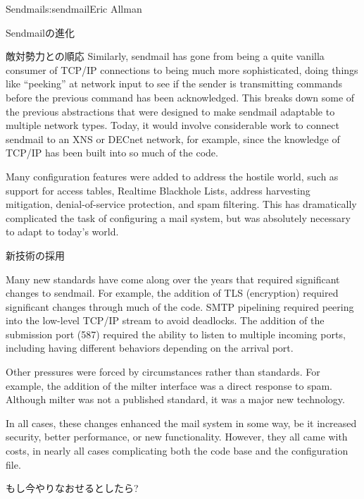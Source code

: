 \begin{aosachapter}{Sendmail}{s:sendmail}{Eric Allman}
\begin{aosasect1}{Sendmailの進化}
\begin{aosasect2}{敵対勢力との順応}
Similarly, sendmail has gone from being a quite vanilla consumer of
TCP/IP connections to being much more sophisticated, doing things like
``peeking'' at network input to see if the sender is transmitting
commands before the previous command has been acknowledged. This
breaks down some of the previous abstractions that were designed to
make sendmail adaptable to multiple network types.  Today, it would
involve considerable work to connect sendmail to an XNS or DECnet
network, for example, since the knowledge of TCP/IP has been built
into so much of the code.

Many configuration features were added to address the hostile world,
such as support for access tables, Realtime Blackhole Lists, address
harvesting mitigation, denial-of-service protection, and spam
filtering.  This has dramatically complicated the task of configuring
a mail system, but was absolutely necessary to adapt to today's world.

\end{aosasect2}

\begin{aosasect2}{新技術の採用}

Many new standards have come along over the years that required
significant changes to sendmail. For example, the addition of TLS
(encryption) required significant changes through much of the
code. SMTP pipelining required peering into the low-level TCP/IP
stream to avoid deadlocks. The addition of the submission port (587)
required the ability to listen to multiple incoming ports, including
having different behaviors depending on the arrival port.

Other pressures were forced by circumstances rather than standards.
For example, the addition of the milter interface was a direct
response to spam. Although milter was not a published standard, it was
a major new technology.

In all cases, these changes enhanced the mail system in some way, be
it increased security, better performance, or new
functionality. However, they all came with costs, in nearly all cases
complicating both the code base and the configuration file.

\end{aosasect2}

\end{aosasect1}

\begin{aosasect1}{もし今やりなおせるとしたら?}


\end{aosasect1}
\end{aosachapter}
